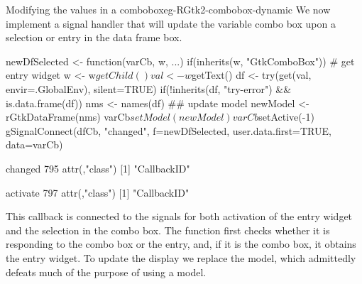 \begin{example}{Modifying the values in a combobox}{eg-RGtk2-combobox-dynamic}
We now implement a signal handler that will update the variable combo
box upon a selection or entry in the data frame box. 
\begin{Schunk}
\begin{Sinput}
 newDfSelected <- function(varCb, w, ...) {
   if(inherits(w, "GtkComboBox"))        # get entry widget
     w <- w$getChild()
   val <- w$getText()
   df <- try(get(val, envir=.GlobalEnv), silent=TRUE)
   if(!inherits(df, "try-error") && is.data.frame(df)) {
     nms <- names(df)
     ## update model
     newModel <- rGtkDataFrame(nms)
     varCb$setModel(newModel)
     varCb$setActive(-1)
   }
 }
 gSignalConnect(dfCb, "changed", f=newDfSelected,
                user.data.first=TRUE,
                data=varCb)
\end{Sinput}
\begin{Soutput}
changed 
    795 
attr(,"class")
[1] "CallbackID"
\end{Soutput}
\begin{Soutput}
activate 
     797 
attr(,"class")
[1] "CallbackID"
\end{Soutput}
\end{Schunk}
%
This callback is connected to the signals for both activation of the
entry widget and the selection in the combo box. The function first
checks whether it is responding to the combo box or the entry, and, if
it is the combo box, it obtains the entry widget. To update the
display we replace the model, which admittedly defeats much of the
purpose of using a model.
\end{example}

